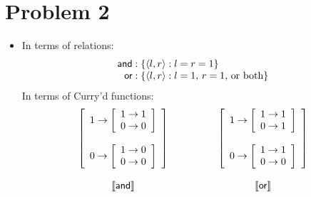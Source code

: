 \section*{Problem 2}

\begin{itemize}
	\item In terms of relations:
		\renewcommand{\arraystretch}{1.5}
		 \[\begin{array}{r@{}l}
		 \textsf{and}:{}& \{\langle l,r \rangle : l = r = 1\}%
		 \\
		 \textsf{or}:{}& \{\langle l,r \rangle : \text{$l = 1$, $r = 1$, or both}\}%
		 \end{array}\]
	In terms of Curry'd functions:
		\[\begin{array}{c@{\hspace{5em}}c}
		\left[\begin{array}{l}
			1 \rightarrow
				\left[\begin{array}{l}
					1 \rightarrow 1
					\\
					0 \rightarrow 0
				\end{array}\right]
			\\\\
			0 \rightarrow
				\left[\begin{array}{l}
					1 \rightarrow 0
					\\
					0 \rightarrow 0
				\end{array}\right]
		\end{array}\right]
		&
		\left[\begin{array}{l}
			1 \rightarrow
				\left[\begin{array}{l}
					1 \rightarrow 1
					\\
					0 \rightarrow 1
				\end{array}\right]
			\\\\
			0 \rightarrow
				\left[\begin{array}{l}
					1 \rightarrow 1
					\\
					0 \rightarrow 0
				\end{array}\right]
		\end{array}\right]
		\\\\
		\sv{\sf and}
		&
		\sv{\sf or}
		\end{array}\]


\end{itemize}
